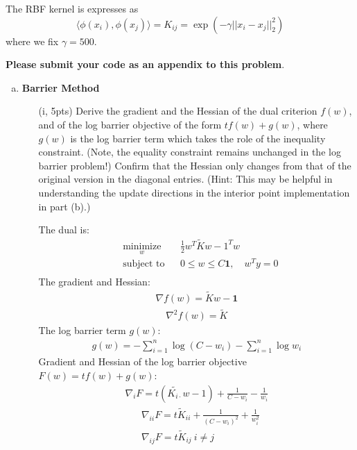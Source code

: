 \documentclass{article}
\theoremstyle{remark}
\theoremstyle{definition}
\begin{document}
The RBF kernel is expresses as
$$\langle \phi(x_i), \phi(x_j) \rangle = K_{ij} = \exp\left(-\gamma||x_i - x_j||_2^2\right)$$
where we fix $\gamma = 500$.

\textbf{Please submit your code as an appendix to this problem}.

\begin{enumerate}[(a)]

\item \textbf{Barrier Method} 
  \begin{enumerate}[(i)]

  \item[(i, 5pts)] Derive the gradient and the Hessian of the dual criterion $f(w)$, and of
    the log barrier objective of the form $tf(w) + g(w)$, where $g(w)$ is the
    log barrier term which takes the role of the inequality constraint. (Note,
    the equality constraint remains unchanged in the log barrier problem!)
    Confirm that the Hessian only changes from that of the original version in
    the diagonal entries. (Hint: This may be helpful in understanding the update
    directions in the interior point implementation in part (b).)
    
    {
    \color{blue}
    The dual is:
    \begin{equation*}
    \begin{aligned} 
      & \underset{w}{\text{minimize}} && \frac{1}{2}w^T \tilde{K} w -1^Tw \\
      & \text{subject to} && 0\leq w\leq C\mathbf{1}, \quad w^Ty = 0\\
    \end{aligned}
    \end{equation*}
    The gradient and Hessian:
    \begin{align*}
        \nabla f(w) = \tilde{K} w-\mathbf{1}
    \end{align*}
    \begin{align*}
        \nabla^2 f(w) = \tilde{K}
    \end{align*}
    The log barrier term $g(w)$:
    \begin{align*}
        g(w) = -\sum_{i=1}^n \log (C-w_i)-\sum_{i=1}^n\log w_i
    \end{align*}
    Gradient and Hessian of the log barrier objective $F(w)=tf(w)+g(w)$:
    \begin{align*}
        \nabla_i F= t(\tilde{K_{i\cdot}}w-1)+\frac{1}{C-w_i}-\frac{1}{w_i}
    \end{align*}
    \begin{align*}
        &\nabla_{ii} F=t\tilde{K}_{ii}+\frac{1}{(C-w_i)^2}+\frac{1}{w_i^2} \\
        &\nabla_{ij} F=t\tilde{K}_{ij} ~ i\neq j
    \end{align*}
    
}
\end{enumerate}
\end{enumerate}
\end{document}
